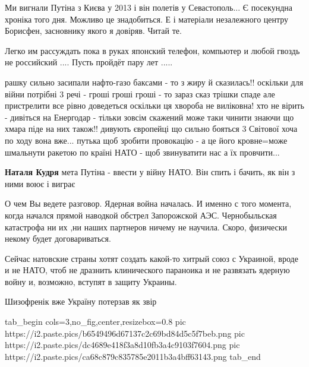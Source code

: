 \begin{itemize}

Ми вигнали Путіна з Києва у 2013 і він полетів у Севастополь... Є посекундна
хроніка того дня. Можливо це знадобиться. Е і матеріали незалежного центру
Борисфен, засновнику якого я довіряв. Читай те.


Легко им рассуждать пока в руках японский телефон, компьютер и любой гвоздь не
российский .... Пусть пройдёт пару лет .....


рашку сильно засипали нафто-газо баксами - то з жиру й сказилась!! оскільки для
війни потрібні 3 речі - гроші гроші гроші - то зараз сказ трішки спаде але
пристрелити все рівно доведеться оскільки ця хвороба не виліковна! хто не
вірить - дивіться на Енергодар - тільки зовсім скажений може таки чинити знаючи
що хмара піде на них також!! дивують європейці що сильно бояться 3 Світової
хоча по ходу вона вже... путька щоб зробити провокацію - а це його кровне=може
шмальнути ракетою по країні НАТО - щоб звинуватити нас а їх провчити...

\textbf{Наталя Кудря} мета Путіна - ввести у війну НАТО. Він спить і бачить, як він з ними воює і виграє


О чем Вы ведете разговор. Ядерная война началась. И именно с того момента,
когда начался прямой наводкой обстрел Запорожской АЭС. Чернобыльская катастрофа
ни их ,ни наших партнеров ничему не научила. Скоро, физически некому будет
договариваться.


Сейчас натовские страны хотят создать какой-то хитрый союз с Украиной, вроде и
не НАТО, чтоб не дразнить клинического параноика и не развязать ядерную войну
и, возможно, вступят в защиту Украины.

Шизофренік вже Україну потерзав як звір

\ifcmt
  tab_begin cols=3,no_fig,center,resizebox=0.8
     pic https://i2.paste.pics/b6549496d67137c2c69bd84d5c5f7beb.png
		 pic https://i2.paste.pics/dc4689e418f3a8d10fb3a4c9103f7604.png
		 pic https://i2.paste.pics/ca68c879c835785e2011b3a4bff63143.png
  tab_end
\fi

\end{itemize} %
